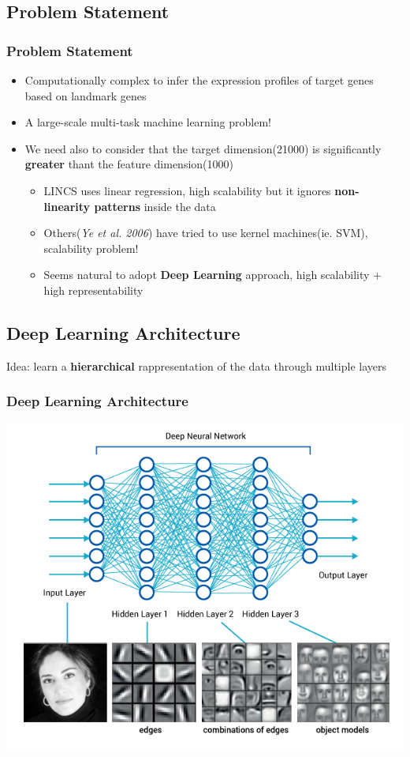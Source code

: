 \documentclass[professionalfont]{beamer}
\begin{document}
      \subsection{Problem Statement}
	\begin{frame}
	 \frametitle{Problem Statement}
	 \begin{itemize}
	  \item Computationally complex to infer the expression profiles of target genes based on landmark genes
	  \item A large-scale multi-task machine learning problem!
	  \item We need also to consider that the target dimension(21000) is significantly \textbf{greater} thant the feature dimension(1000)
	  \begin{itemize}
	    \item LINCS uses linear regression, high scalability but it ignores \textbf{non-linearity patterns} inside the data
	    \item Others(\textit{Ye et al. 2006}) have tried to use kernel machines(ie. SVM), scalability problem!
	    \item Seems natural to adopt \textbf{Deep Learning} approach, high scalability + high representability 
	  \end{itemize}
	 \end{itemize}
	\end{frame}


      \subsection{Deep Learning Architecture}
	\begin{frame}
	  Idea: learn a \textbf{hierarchical} rappresentation of the data through multiple layers
	  \frametitle{Deep Learning Architecture}
	  \begin{center}
	    \includegraphics[scale=0.35]{deep_learning_net.jpg}
	  \end{center}
	\end{frame}
\end{document}
